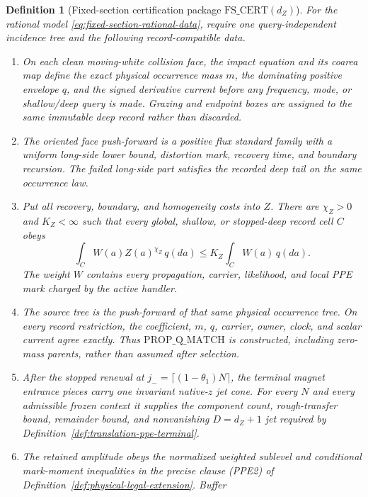 \documentclass[11pt]{article}
\newtheorem{definition}[theorem]{Definition}
\begin{document}
\begin{definition}[Fixed-section certification package
$\mathrm{FS\_CERT}(d_Z)$]
\label{def:fixed-section-cert}
For the rational model \eqref{eq:fixed-section-rational-data}, require one
query-independent incidence tree and the following record-compatible data.
\begin{enumerate}[label=\textup{(FS\arabic*)}]
\item On each clean moving-white collision face, the impact equation and its
coarea map define the exact physical occurrence mass $m$, the dominating
positive envelope $q$, and the signed derivative current before any
frequency, mode, or shallow/deep query is made.  Grazing and endpoint boxes
are assigned to the same immutable deep record rather than discarded.
\item The oriented face push-forward is a positive flux standard family
with a uniform long-side lower bound, distortion mark, recovery time, and
boundary recursion.  The failed long-side part satisfies the recorded deep
tail on the same occurrence law.
\item Put all recovery, boundary, and homogeneity costs into $Z$.  There are
$\chi_Z>0$ and $K_Z<\infty$ such that every global, shallow, or
stopped-deep record cell $C$ obeys
\begin{equation}
 \int_C W(a)Z(a)^{\chi_Z}\,q(da)
 \le K_Z\int_C W(a)\,q(da).
\label{eq:fixed-section-hereditary-Z}
\end{equation}
The weight $W$ contains every propagation, carrier, likelihood, and local
PPE mark charged by the active handler.
\item The source tree is the push-forward of that same physical occurrence
tree.  On every record restriction, the coefficient, $m$, $q$, carrier,
owner, clock, and scalar current agree exactly.  Thus
$\mathrm{PROP\_Q\_MATCH}$ is constructed, including zero-mass parents,
rather than assumed after selection.
\item After the stopped renewal at
$j_- =\lceil(1-\theta_1)N\rceil$, the terminal magnet entrance pieces carry
one invariant native-$z$ jet cone.  For every $N$ and every admissible frozen
context it supplies the component count, rough-transfer bound, remainder
bound, and nonvanishing $D=d_Z+1$ jet required by
Definition~\ref{def:translation-ppe-terminal}.
\item The retained amplitude obeys the normalized weighted sublevel and
conditional mark-moment inequalities in the precise clause \textup{(PPE2)}
of Definition~\ref{def:physical-legal-extension}.  Buffer

\end{enumerate}
\end{definition}
\end{document}
